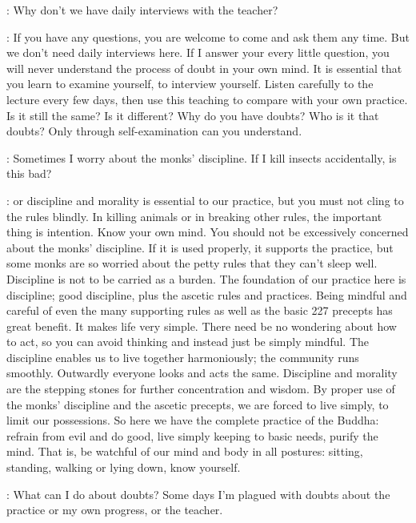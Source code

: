 :
Why don't we have daily interviews with the teacher? 

: If you have any questions, you are welcome to come and ask them any time. But we don't need daily interviews here. If I answer your every little question, you will never understand the process of doubt in your own mind. It is essential that you learn to examine yourself, to interview yourself. Listen carefully to the lecture every few days, then use this teaching to compare with your own practice. Is it still the same? Is it different? Why do you have doubts? Who is it that doubts? Only through self-examination can you understand. 

:
Sometimes I worry about the monks' discipline. If I kill insects accidentally, is this bad? 

:  or discipline and morality is essential to our practice, but you must not cling to the rules blindly. In killing animals or in breaking other rules, the important thing is intention. Know your own mind. You should not be excessively concerned about the monks' discipline. If it is used properly, it supports the practice, but some monks are so worried about the petty rules that they can't sleep well. Discipline is not to be carried as a burden. The foundation of our practice here is discipline; good discipline, plus the ascetic rules and practices. Being mindful and careful of even the many supporting rules as well as the basic 227 precepts has great benefit. It makes life very simple. There need be no wondering about how to act, so you can avoid thinking and instead just be simply mindful. The discipline enables us to live together harmoniously; the community runs smoothly. Outwardly everyone looks and acts the same. Discipline and morality are the stepping stones for further concentration and wisdom. By proper use of the monks' discipline and the ascetic precepts, we are forced to live simply, to limit our possessions. So here we have the complete practice of the Buddha: refrain from evil and do good, live simply keeping to basic needs, purify the mind. That is, be watchful of our mind and body in all postures: sitting, standing, walking or lying down, know yourself. 

:
What can I do about doubts? Some days I'm plagued with doubts about the practice or my own progress, or the teacher. 


